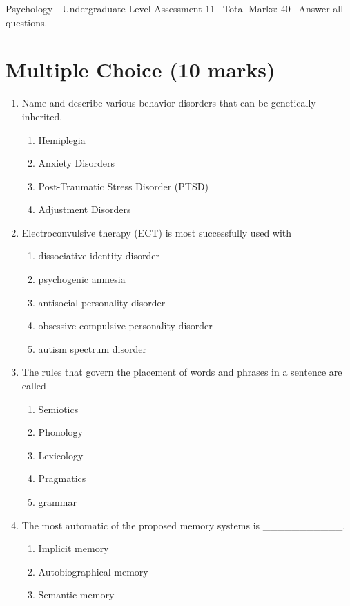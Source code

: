 \documentclass[12pt]{article}
\begin{document}
\begin{center}
Psychology - Undergraduate Level Assessment 11 \
Total Marks: 40 \
Answer all questions.
\end{center}

\section*{Multiple Choice (10 marks)}
\begin{enumerate}[label=\arabic*.]
\item Name and describe various behavior disorders that can be genetically inherited.
\begin{enumerate}[label=(\alph*)]
    \item Hemiplegia
    \item Anxiety Disorders
    \item Post-Traumatic Stress Disorder (PTSD)
    \item Adjustment Disorders
\end{enumerate}
\item Electroconvulsive therapy (ECT) is most successfully used with
\begin{enumerate}[label=(\alph*)]
    \item dissociative identity disorder
    \item psychogenic amnesia
    \item antisocial personality disorder
    \item obsessive-compulsive personality disorder
    \item autism spectrum disorder
\end{enumerate}
\item The rules that govern the placement of words and phrases in a sentence are called
\begin{enumerate}[label=(\alph*)]
    \item Semiotics
    \item Phonology
    \item Lexicology
    \item Pragmatics
    \item grammar
\end{enumerate}
\item The most automatic of the proposed memory systems is \_\_\_\_\_\_\_\_\_\_\_.
\begin{enumerate}[label=(\alph*)]
    \item Implicit memory
    \item Autobiographical memory
    \item Semantic memory

\end{enumerate}
\end{enumerate}
\end{document}
